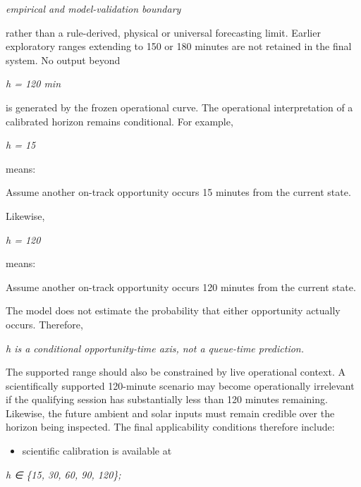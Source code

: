\begin{center}\textit{empirical and model-validation boundary}\end{center}

rather than a rule-derived, physical or universal forecasting limit. Earlier exploratory ranges extending to 150 or 180 minutes are not retained in the final system. No output beyond

\begin{center}\textit{h = 120 min}\end{center}

is generated by the frozen operational curve. The operational interpretation of a calibrated horizon remains conditional. For example,

\begin{center}\textit{h = 15}\end{center}

means:

Assume another on-track opportunity occurs 15 minutes from the current state.

Likewise,

\begin{center}\textit{h = 120}\end{center}

means:

Assume another on-track opportunity occurs 120 minutes from the current state.

The model does not estimate the probability that either opportunity actually occurs. Therefore,

\begin{center}\textit{h is a conditional opportunity-time axis, not a queue-time prediction.}\end{center}

The supported range should also be constrained by live operational context. A scientifically supported 120-minute scenario may become operationally irrelevant if the qualifying session has substantially less than 120 minutes remaining. Likewise, the future ambient and solar inputs must remain credible over the horizon being inspected. The final applicability conditions therefore include:

\begin{itemize}
\item scientific calibration is available at
\end{itemize}

\begin{center}\textit{h ∈ \{15, 30, 60, 90, 120\};}\end{center}

